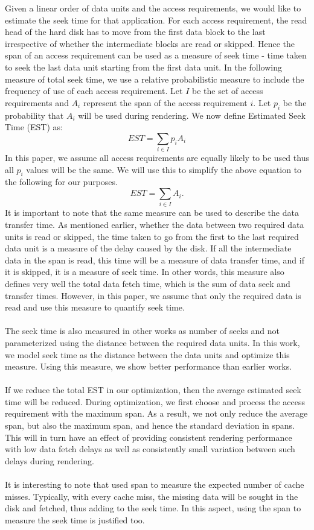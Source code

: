 Given a linear order of data units and the access requirements, we would like to
estimate the seek time for that application.  For each access requirement, the
read head of the hard disk has to move from the first data block to the last
irrespective of whether the intermediate blocks are read or skipped. Hence the
span of an access requirement can be used as a measure of seek time - time
taken to seek the last data unit starting from the first data unit. In the following measure of total seek time, we use a relative probabilistic measure to include the frequency of use of each access requirement.  Let $I$ be
the set of access requirements and $A_i$ represent the span of the access
requirement $i$. Let $p_i$ be the probability that $A_i$ will be used during rendering. We now define Estimated Seek Time (EST) as:
\begin{equation}
EST = \sum_{i\in I}p_i A_i
\end{equation}
In this paper, we assume all access requirements are equally likely to be used thus all $p_i$ values will be the same. We will use this to simplify the above equation to the following for our purposes.
\[
EST = \sum_{i \in I}{A_i}.
\]
It is important to note that the same measure can be used to describe the data transfer time. As mentioned earlier, whether the data between two required data units is read or skipped, the time taken to go from the first to the last required data unit is a measure of the delay caused by the disk. If all the intermediate data in the span is read, this time will be a measure of data transfer time, and if it is skipped, it is a measure of seek time.  In other words, this measure also defines very well the total data fetch time, which is the sum of data seek and transfer times. However, in this paper, we assume that only the required data is read and use this measure to quantify seek time.  \\
\\
The seek time is also measured in other works \cite{optimizingredundancy,singleseeklayout} as number of seeks and not parameterized using the distance between the required data units. In this work, we model seek time as the distance between the data units and optimize this measure. Using this measure, we show better performance than earlier works.\\
\\
If we reduce the total EST in our optimization, then the average estimated seek time will be reduced. During optimization, we first  choose and process the access requirement with the maximum span. As a result, we not only reduce the average span, but also the maximum span, and hence the standard deviation in spans. This will in turn have an effect of providing consistent rendering performance with low data fetch delays as well as consistently small variation between such delays during rendering. \\
\\
It is interesting to note that \cite{cacheobliviouslayout}
used span to measure the expected number of cache misses.  Typically, with
every cache miss, the missing data will be sought in the disk and fetched, thus
adding to the seek time. In this aspect, using the span to measure the seek time is
justified too.


